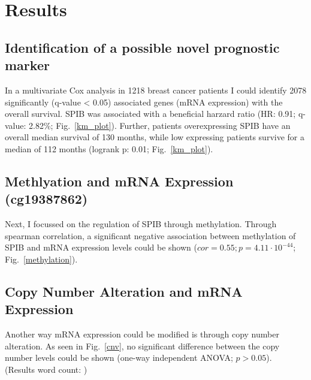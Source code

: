 \section{Results}
\countem

\subsection{Identification of a possible novel prognostic marker}

In a multivariate Cox analysis in 1218 breast cancer patients I could identify 2078 significantly (q-value < 0.05) associated genes (mRNA expression) with the overall survival.
SPIB was associated with a beneficial harzard ratio (HR: 0.91; q-value: 2.82\%; Fig.~\ref{km_plot}).
Further, patients overexpressing SPIB have an overall median survival of 130 months, while low expressing patients survive for a median of 112 months (logrank p: 0.01; Fig.~\ref{km_plot}).

\subsection{Methlyation and mRNA Expression (cg19387862)}

Next, I focussed on the regulation of SPIB through methylation.
Through spearman correlation, a significant negative association between methylation of SPIB and mRNA expression levels could be shown ($cor = 0.55; p= 4.11 \cdot 10^{-44}$; Fig.~\ref{methylation}).

\subsection{Copy Number Alteration and mRNA Expression}

Another way mRNA expression could be modified is through copy number alteration.
As seen in Fig.~\ref{cnv}, no significant difference between the copy number levels could be shown (one-way independent ANOVA; $p > 0.05$).
\\
\endcountem 
(Results word count: \thewordcount{})